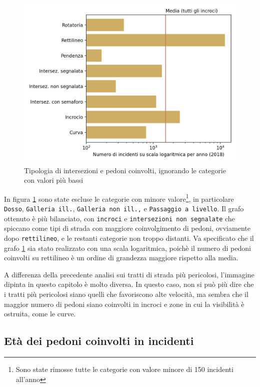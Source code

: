 \documentclass[a4paper]{report}
\newcommand{\columnstyle}[1]{\texttt{#1}}
\begin{document}
\begin{figure}
    \includegraphics[width=\linewidth]{../src/incidenti/incidenti_senza_coords/pedoni/pedoni_no_rett.png}
    \caption{Tipologia di intersezioni e pedoni coinvolti, ignorando le categorie con valori più bassi}
    \label{fig:pedoni-no-rett}
\end{figure}

In figura \ref{fig:pedoni-no-rett} sono state escluse le categorie con minore 
valore\footnote{Sono state rimosse tutte le categorie con valore minore di 
150 incidenti all'anno}, 
in particolare \columnstyle{Dosso}, \columnstyle{Galleria ill.}, 
\columnstyle{Galleria non ill.,} e \columnstyle{Passaggio a livello}.
Il grafo ottenuto è più bilanciato, con \columnstyle{incroci} e 
\columnstyle{intersezioni non segnalate} che spiccano come tipi di strada con 
maggiore coinvolgimento di pedoni, ovviamente dopo \columnstyle{rettilineo}, 
e le restanti categorie non troppo distanti.
Va specificato che il grafo \ref{fig:pedoni-no-rett} sia stato realizzato con 
una scala logaritmica, poichè il numero di pedoni coinvolti su rettilineo è un 
ordine di grandezza maggiore rispetto alla media.

A differenza della precedente analisi sui tratti di strada più pericolosi, 
l'immagine dipinta in questo capitolo è molto diversa.
In questo caso, non si può più dire che i tratti più pericolosi siano quelli 
che favoriscono alte velocità, ma sembra che il maggior numero di pedoni 
siano coinvolti in incroci e zone in cui la visibilità è ostruita, come le curve.

\subsection{Età dei pedoni coinvolti in incidenti}
\end{document}
